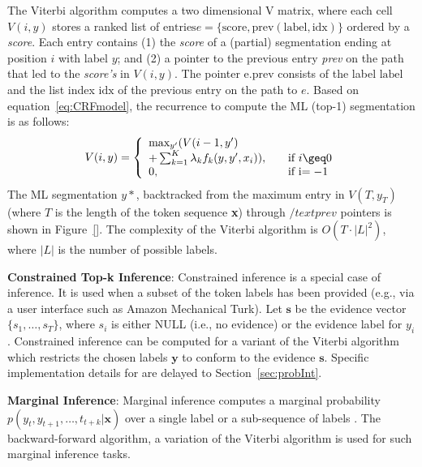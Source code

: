 The Viterbi algorithm computes a two dimensional V matrix, where each cell $V(i,y)$ stores a ranked list of $\text{entries} e = \{\text{score},\text{prev}(\text{label},\text{idx})\}$ ordered by a \textit{score}.  Each entry contains (1) the \textit{score} of a \topk (partial) segmentation ending at position $i$ with label $y$; and (2) a pointer to the previous entry \textit{prev} on the path that led to the \topk \textit{score's} in $V(i,y)$.  The pointer $\text{e.prev}$ consists of the label $\text{label}$ and the list index $\text{idx}$ of the previous entry on the path to $e$.  Based on equation~\ref{eq:CRFmodel}, the recurrence to compute the ML (top-1) segmentation is as follows:
\begin{equation}
V(i,y) = \left\{
\begin{array}{l l}
\text{max}_{y'}(V(i-1,y')\\
   + \sum_{k=1}^{K}\lambda_{k}f_{k}(y,y',x_{i})), & \quad \text{if } i \geq 0\\
0, & \quad \text{if } $i$ = -1
\end{array} \right.
\end{equation}
The ML segmentation $y*$, backtracked from the maximum entry in $V(T,y_{T})$ (where $T$ is the length of the token sequence \textbf{x}) through $/text{prev}$ pointers is shown in Figure~\ref{}.  The complexity of the Viterbi algorithm is $O(T \cdot |L|^{2})$, where $|L|$ is the number of possible labels.

\textbf{Constrained Top-k Inference}: Constrained \topk inference \cite{} is a special case of \topk inference.  It is used when a subset of the token labels has been provided (e.g., via a user interface such as Amazon Mechanical Turk).  Let $\mathbf{s}$ be the evidence vector $\{s_{1}, \dots, s_{T}\}$, where $s_{i}$ is either NULL (i.e., no evidence) or the evidence label for $y_{i}$.  Constrained \topk inference can be computed for a variant of the Viterbi algorithm which restricts the chosen labels $\mathbf{y}$ to conform to the evidence $\mathbf{s}$.  Specific implementation details for \sysName are delayed to Section~\ref{sec:probInt}.

\textbf{Marginal Inference}: Marginal inference computes a marginal probability $p(y_{t},y_{t+1}, \dots, t_{t+k}|\mathbf{x})$ over a single label or a sub-sequence of labels \cite{}.  The backward-forward algorithm, a variation of the Viterbi algorithm is used for such marginal inference tasks.

